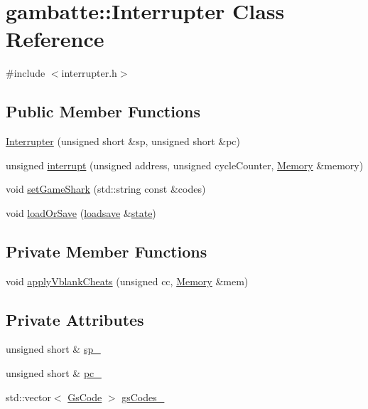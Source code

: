 \hypertarget{classgambatte_1_1Interrupter}{}\section{gambatte\+:\+:Interrupter Class Reference}
\label{classgambatte_1_1Interrupter}


{\ttfamily \#include $<$interrupter.\+h$>$}

\subsection*{Public Member Functions}
\begin{DoxyCompactItemize}
\item 
\hyperlink{classgambatte_1_1Interrupter_ac5cc5945d01f7aef799534e158cb3333}{Interrupter} (unsigned short \&sp, unsigned short \&pc)
\item 
unsigned \hyperlink{classgambatte_1_1Interrupter_ac6524a6a4564f6344b5079c856ad9bb2}{interrupt} (unsigned address, unsigned cycle\+Counter, \hyperlink{classgambatte_1_1Memory}{Memory} \&memory)
\item 
void \hyperlink{classgambatte_1_1Interrupter_a8e0276566ebb30bdc152da124effb5ea}{set\+Game\+Shark} (std\+::string const \&codes)
\item 
void \hyperlink{classgambatte_1_1Interrupter_a5d451c6ea015191f327fdbac59a22f2d}{load\+Or\+Save} (\hyperlink{classgambatte_1_1loadsave}{loadsave} \&\hyperlink{ppu_8cpp_a2f2eca6997ee7baf8901725ae074d45b}{state})
\end{DoxyCompactItemize}
\subsection*{Private Member Functions}
\begin{DoxyCompactItemize}
\item 
void \hyperlink{classgambatte_1_1Interrupter_a533447c83ddc4032778442b5369993af}{apply\+Vblank\+Cheats} (unsigned cc, \hyperlink{classgambatte_1_1Memory}{Memory} \&mem)
\end{DoxyCompactItemize}
\subsection*{Private Attributes}
\begin{DoxyCompactItemize}
\item 
unsigned short \& \hyperlink{classgambatte_1_1Interrupter_a1898ada5e6a5b478aa42a4af5c0733c3}{sp\+\_\+}
\item 
unsigned short \& \hyperlink{classgambatte_1_1Interrupter_ab6f9e0d61e888fd694262341f001b3e4}{pc\+\_\+}
\item 
std\+::vector$<$ \hyperlink{structgambatte_1_1GsCode}{Gs\+Code} $>$ \hyperlink{classgambatte_1_1Interrupter_addc1ed44b825db658985d49290918353}{gs\+Codes\+\_\+}
\end{DoxyCompactItemize}



